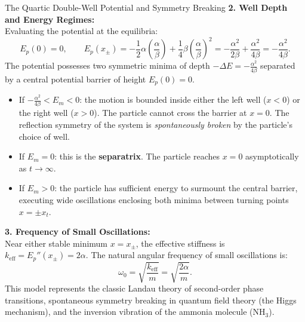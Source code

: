 \begin{workedexample}{The Quartic Double-Well Potential and Symmetry Breaking}
\textbf{2. Well Depth and Energy Regimes:}\\
Evaluating the potential at the equilibria:
\[
E_p(0) = 0, \qquad E_p(x_{\pm}) = -\frac{1}{2}\alpha\left(\frac{\alpha}{\beta}\right) + \frac{1}{4}\beta\left(\frac{\alpha}{\beta}\right)^2 = -\frac{\alpha^2}{2\beta} + \frac{\alpha^2}{4\beta} = -\frac{\alpha^2}{4\beta}.
\]
The potential possesses two symmetric minima of depth $-\Delta E = -\frac{\alpha^2}{4\beta}$ separated by a central potential barrier of height $E_p(0) = 0$.
\begin{itemize}[leftmargin=1.5em,itemsep=2pt]
  \item If $-\frac{\alpha^2}{4\beta} < E_m < 0$: the motion is bounded inside either the left well ($x < 0$) or the right well ($x > 0$). The particle cannot cross the barrier at $x = 0$. The reflection symmetry of the system is \emph{spontaneously broken} by the particle's choice of well.
  \item If $E_m = 0$: this is the \textbf{separatrix}. The particle reaches $x = 0$ asymptotically as $t \to \infty$.
  \item If $E_m > 0$: the particle has sufficient energy to surmount the central barrier, executing wide oscillations enclosing both minima between turning points $x = \pm x_t$.
\end{itemize}

\textbf{3. Frequency of Small Oscillations:}\\
Near either stable minimum $x = x_{\pm}$, the effective stiffness is $k_{\text{eff}} = E_p''(x_{\pm}) = 2\alpha$.
The natural angular frequency of small oscillations is:
\[
\omega_0 = \sqrt{\frac{k_{\text{eff}}}{m}} = \sqrt{\frac{2\alpha}{m}}.
\]
This model represents the classic Landau theory of second-order phase transitions, spontaneous symmetry breaking in quantum field theory (the Higgs mechanism), and the inversion vibration of the ammonia molecule ($\mathrm{NH}_3$).
\end{workedexample}

